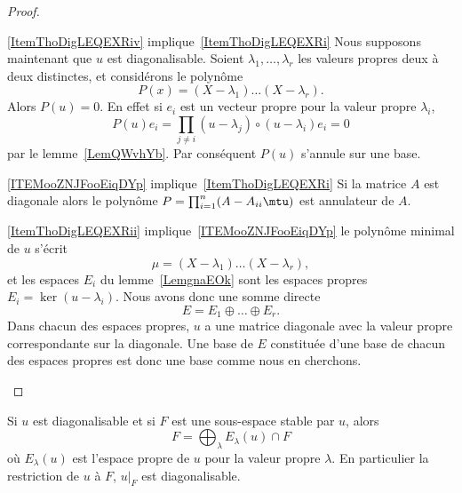 \begin{proof}
\begin{subproof}
\item[\ref{ItemThoDigLEQEXRiv} implique~\ref{ItemThoDigLEQEXRi}] Nous supposons maintenant que \( u\) est diagonalisable. Soient \( \lambda_1,\ldots, \lambda_r\) les valeurs propres deux à deux distinctes, et considérons le polynôme
    \begin{equation}
        P(x)=(X-\lambda_1)\ldots (X-\lambda_r).
    \end{equation}
    Alors \( P(u)=0\). En effet si \( e_i\) est un vecteur propre pour la valeur propre \( \lambda_i\),
    \begin{equation}
        P(u)e_i=\prod_{j\neq i}(u-\lambda_j)\circ(u-\lambda_i)e_i=0
    \end{equation}
    par le lemme~\ref{LemQWvhYb}. Par conséquent \( P(u)\) s'annule sur une base.

\item[\ref{ITEMooZNJFooEiqDYp} implique~\ref{ItemThoDigLEQEXRi}]
    Si la matrice \( A\) est diagonale alors le polynôme \( P=\prod_{i=1}^n(A-A_{ii}\mtu)\) est annulateur de \( A\).
        \item[\ref{ItemThoDigLEQEXRii} implique~\ref{ITEMooZNJFooEiqDYp}]
            le polynôme minimal de \( u\) s'écrit
            \begin{equation}
                \mu=(X-\lambda_1)\ldots(X-\lambda_r),
            \end{equation}
            et les espaces $E_i$ du lemme~\ref{LemgnaEOk} sont les espaces propres \( E_i=\ker(u-\lambda_i)\). Nous avons donc une somme directe
            \begin{equation}
                E=E_1\oplus\ldots\oplus E_r.
            \end{equation}
            Dans chacun des espaces propres, $u$ a une matrice diagonale avec la valeur propre correspondante sur la diagonale. Une base de \( E\) constituée d'une base de chacun des espaces propres est donc une base comme nous en cherchons.
    \end{subproof}
\end{proof}

\begin{corollary}       \label{CorQeVqsS}
    Si \( u\) est diagonalisable et si \( F\) est une sous-espace stable par \( u\), alors
    \begin{equation}
        F=\bigoplus_{\lambda}E_{\lambda}(u)\cap F
    \end{equation}
    où \( E_{\lambda}(u)\) est l'espace propre de \( u\) pour la valeur propre \( \lambda\). En particulier la restriction de \( u\) à \( F\), \( u|_F\) est diagonalisable.
\end{corollary}

